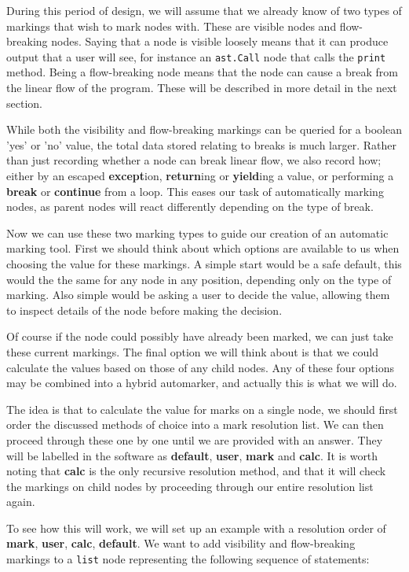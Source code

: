 \documentclass{report}
\begin{document}
During this period of design, we will assume that we already know of two types of markings that wish to mark nodes with. These are visible nodes
and flow-breaking nodes. Saying that a node is visible loosely means that it can produce output that a user will see, for instance an \texttt{ast.Call}
node that calls the \texttt{print} method. Being a flow-breaking node means that the node can cause a break from the linear flow of the program. These
will be described in more detail in the next section.

While both the visibility and flow-breaking markings can be queried for a boolean 'yes' or 'no' value, the total data stored relating to breaks is much
larger. Rather than just recording whether a node can break linear flow, we also record how; either by an escaped \textbf{except}ion,
\textbf{return}ing or \textbf{yield}ing a value, or performing a \textbf{break} or \textbf{continue} from a loop. This eases our task of automatically
marking nodes, as parent nodes will react differently depending on the type of break.

Now we can use these two marking types to guide our creation of an automatic marking tool. First we should think about which options are available
to us when choosing the value for these markings. A simple start would be a safe default, this would the the same for any node in any position,
depending only on the type of marking. Also simple would be asking a user to decide the value, allowing them to inspect details of the node before
making the decision.

Of course if the node could possibly have already been marked, we can just take these current markings. The final option we will think about is
that we could calculate the values based on those of any child nodes. Any of these four options may be combined into a hybrid automarker, and actually
this is what we will do.

The idea is that to calculate the value for marks on a single node, we should first order the discussed methods of choice into a mark resolution
list. We can then proceed through these one by one until we are provided with an answer. They will be labelled in the software as
\textbf{default}, \textbf{user}, \textbf{mark} and \textbf{calc}. It is worth noting that \textbf{calc} is the only recursive resolution method,
and that it will check the markings on child nodes by proceeding through our entire resolution list again.

To see how this will work, we will set up an example with a resolution order of \textbf{mark}, \textbf{user}, \textbf{calc}, \textbf{default}.
We want to add visibility and flow-breaking markings to a \texttt{list} node representing the following sequence of statements:
\end{document}
